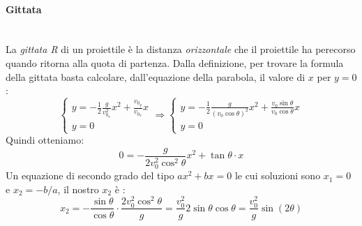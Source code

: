 \documentclass[12pt]{report}
\begin{document}
	\paragraph{Gittata} \quad \\
	La \textit{gittata R} di un proiettile è  la distanza \textit{orizzontale} che il proiettile ha perecorso quando ritorna alla quota di partenza. Dalla definizione, per trovare la formula della gittata basta calcolare, dall'equazione della parabola, il valore di $x$ per $y=0$:
	\[
	\begin{cases}
		y=-\frac{1}{2}\frac{g}{v_{0_x}^2}x^2+\frac{v_{0_y}}{v_{0_x}}x \\
		y=0
	\end{cases} \Rightarrow \begin{cases}
		y=-\frac{1}{2}\frac{g}{(v_{0}\cos\theta)^2}x^2+\frac{v_{0}\sin\theta}{v_{0}\cos\theta}x \\
		y=0
	\end{cases}
	\]
	Quindi otteniamo:
	\[
	0 = -\frac{g}{2v_0^2\cos^2\theta}x^2 + \tan\theta \cdot x
	\]
	Un equazione di secondo grado del tipo $ax^2+bx = 0$ le cui soluzioni sono $x_1 = 0$ e $x_2 = -b/a$, il nostro $x_2$ è :
	\[
	x_2 = -\frac{\sin\theta}{\cos\theta} \cdot \frac{2v_0^2\cos^2\theta}{g} = \frac{v_0^2}{g}2\sin\theta\cos\theta = \frac{v_0^2}{g}\sin(2\theta)
	\]
\end{document}
